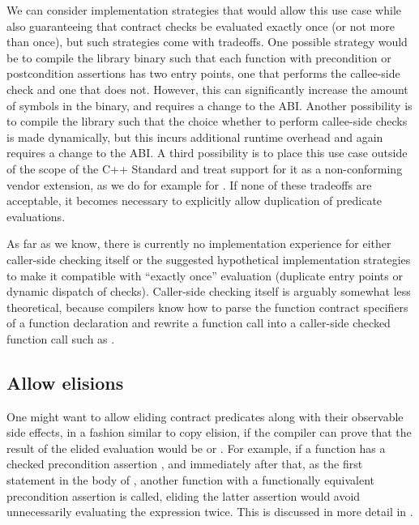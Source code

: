 We can consider implementation strategies that would allow this use case while also guaranteeing that contract checks be evaluated exactly once (or not more than once), but such strategies come with tradeoffs. One possible strategy would be to compile the library binary such that each function with precondition or postcondition assertions has two entry points, one that performs the callee-side check and one that does not. However, this can significantly increase the amount of symbols in the binary, and requires a change to the ABI. Another possibility is to compile the library such that the choice whether to perform callee-side checks is made dynamically, but this incurs additional runtime overhead and again requires a change to the ABI. A third possibility is to place this use case outside of the scope of the C++ Standard and treat support for it as a non-conforming vendor extension, as we do for example for . If none of these tradeoffs are acceptable, it becomes necessary to explicitly allow duplication of predicate evaluations.

As far as we know, there is currently no implementation experience for either caller-side checking itself or the suggested hypothetical implementation strategies to make it compatible with ``exactly once'' evaluation (duplicate entry points or dynamic dispatch of checks). Caller-side checking itself is arguably somewhat less theoretical, because compilers know how to parse the function contract specifiers of a function declaration and rewrite a function call  into a caller-side checked function call such as \mbox{}. 

\subsection{Allow elisions}
\label{subsec:elisions}

One might want to allow eliding contract predicates along with their observable side effects, in a fashion similar to copy elision, if the compiler can prove that the result of the elided evaluation would be  or . For example, if a function  has a checked precondition assertion , and immediately after that, as the first statement in the body of , another function  with a functionally equivalent precondition assertion is called, eliding the latter assertion would avoid unnecessarily evaluating the expression  twice. This is discussed in more detail in \cite{P2751R1}.

